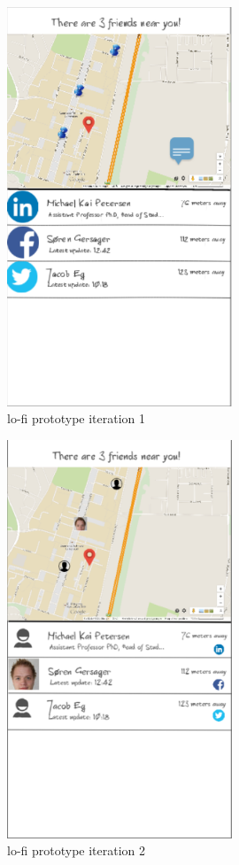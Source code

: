 \documentclass[runningheads,a4paper]{llncs}
\begin{document}
\begin{figure}
\centering
\caption{lo-fi prototype iteration 1}
\includegraphics[width=0.6\textwidth]{figures/lo-fi-4}
\end{figure}

\begin{figure}
\centering
\caption{lo-fi prototype iteration 2}
\includegraphics[width=0.6\textwidth]{figures/lo-fi-3}
\end{figure}
\end{document}
